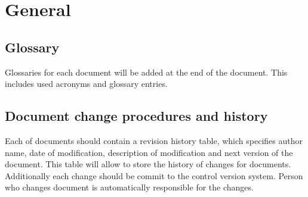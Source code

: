 \chapter{General} \label{chp:general}
	\begin{comment}
		Introduce the following subordinate sections. This section includes the Glossary and document change
		procedures.
	\end{comment}

\section{Glossary} \label{s:general:glossary}
	\begin{comment}
		Provide an alphabetical list of terms that may require definition for the users of the MTP with their
		corresponding definitions. This includes acronyms. There may also be a reference to a project glossary,
		possibly posted online.
	\end{comment}
	Glossaries for each document will be added at the end of the document. This includes used acronyms and glossary entries.
\section{Document change procedures and history} \label{s:general:document-change-procedures-and-history}
	\begin{comment}
		Specify the means for identifying, approving, implementing, and recording changes to the MTP. This
		may be recorded in an overall configuration management system that is documented in a Configuration
		Management Plan that is referenced here. The change procedures need to include a log of all of the
		changes that have occurred since the inception of the MTP. This may include a Document ID (every
		testing document should have a unique ID connected to the system project), version number
		(sequential starting with first approved version), description of document changes, reason for changes
		(e.g., audit comments, team review, system changes), name of person making changes, and role of
		person to document (e.g., document author, project manager, system owner). This information is
		commonly put on an early page in the document (after the title page and before Section 1). Some
		organizations put this information at the end of the document.
	\end{comment}
	Each of documents should contain a revision history table, which specifies author name,
	date of modification, description of modification and next version of the document.
	This table will allow to store the history of changes for documents. Additionally each
	change should be commit to the control version system. Person who changes document
	is automatically responsible for the changes.
